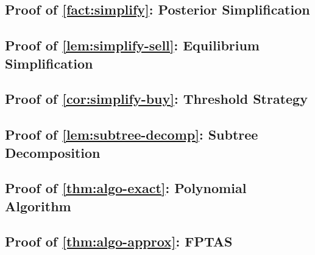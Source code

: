 \subsection{Proof of \texorpdfstring{\cref{fact:simplify}}{Fact~\ref{fact:simplify}}: Posterior Simplification}



\subsection{Proof of \texorpdfstring{\cref{lem:simplify-sell}}{Lemma~\ref{lem:simplify-sell}}: Equilibrium Simplification}
\lemSimplifySell*



\subsection{Proof of \texorpdfstring{\cref{cor:simplify-buy}}{Corollary~\ref{cor:simplify-buy}}: Threshold Strategy}
\corSimplifyBuy*



\subsection{Proof of \texorpdfstring{\cref{lem:subtree-decomp}}{Lemma~\ref{lem:subtree-decomp}}: Subtree Decomposition}
\lemSubtreeDecomp*



\subsection{Proof of \texorpdfstring{\cref{thm:algo-exact}}{Theorem~\ref{thm:algo-exact}}: Polynomial Algorithm}
\thmAlgoExact*



\subsection{Proof of \texorpdfstring{\cref{thm:algo-approx}}{Theorem~\ref{thm:algo-approx}}: FPTAS}
\thmAlgoApprox*



